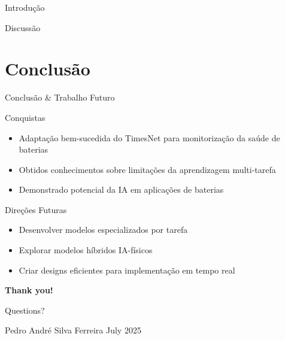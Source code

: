 \begin{frame}{Introdução}
\begin{frame}
\begin{frame}{Discussão}
\end{frame}

\section{Conclusão}
\begin{frame}{Conclusão \& Trabalho Futuro}
  \begin{block}{Conquistas}
    \begin{itemize}
      \item Adaptação bem-sucedida do TimesNet para monitorização da saúde de baterias
      \item Obtidos conhecimentos sobre limitações da aprendizagem multi-tarefa
      \item Demonstrado potencial da IA em aplicações de baterias
    \end{itemize}
  \end{block}
  
  \begin{exampleblock}{Direções Futuras}
    \begin{itemize}
      \item Desenvolver modelos especializados por tarefa
      \item Explorar modelos híbridos IA-físicos
      \item Criar designs eficientes para implementação em tempo real
    \end{itemize}
  \end{exampleblock}
  
  \vspace{0.5cm}
  
  \centering
\end{frame}

\begin{frame}[plain]
  \centering
  \Huge \textbf{Thank you!}
  
  \vspace{1cm}
  
  \normalsize
  Questions?
  
  \vspace{0.5cm}
  \small
  Pedro André Silva Ferreira
  July 2025
\end{frame}


\end{frame}
\end{frame}

